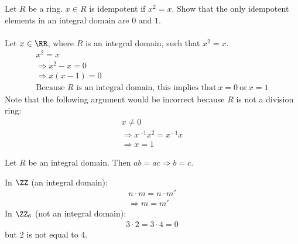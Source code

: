 \documentclass[class=scrartcl, crop=false]{standalone}
\begin{document}
\begin{example}
  Let $R$ be a ring. $x \in R$ is idempotent if $x^2 = x$. Show that the only idempotent elements in an integral domain are $0$ and $1$.
  \\\\
  Let $x \in \RR$, where $R$ is an integral domain, such that $x^2 = x$.
  \begin{gather*}
    x^2 = x \\
    \Rightarrow x^2 - x = 0 \\
    \Rightarrow x(x - 1) = 0 \\
    \text{Because $R$ is an integral domain, this implies that} \ x = 0 \ \text{or} \  x = 1
  \end{gather*} 
  Note that the following argument would be incorrect because $R$ is not a division ring:
  \begin{gather*}
    x \neq 0 \\ 
    \Rightarrow x^{-1} x^2 = x^{-1} x \\
    \Rightarrow x = 1
  \end{gather*} 
\end{example} 

\begin{theorem}
  Let $R$ be an integral domain. Then $ab = ac \Rightarrow b = c$.
  \begin{example}
    In $\ZZ$ (an integral domain):
    \begin{gather*}
      n \cdot m = n \cdot m' \\
      \Rightarrow m = m'
    \end{gather*} 
    In $\ZZ_6$ (not an integral domain): 
    \begin{gather*}
      3 \cdot 2 = 3 \cdot 4 = 0
    \end{gather*} but 2 is not equal to 4.
  \end{example} 
\end{theorem} 
\end{document}
